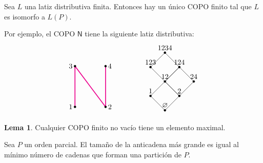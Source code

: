 \documentclass[spanish]{book}
\theoremstyle{definition}
\newtheorem*{lema}{Lema}
\begin{document}
\begin{teo}
	Sea $L$ una latiz distributiva finita. Entonces hay un único COPO finito tal que $L$ es isomorfo a $L(P)$.
\end{teo}
Por ejemplo, el COPO $\mathsf{N}$ tiene la siguiente latiz distributiva:
\[\begin{tikzpicture}
	\draw[magenta,very thick] (0,0) -- (0,2);
	\draw[magenta,very thick] (0,2) -- (1.5,0);
	\draw[magenta,very thick] (1.5,0) -- (1.5,2);
	
	\filldraw (1.5,0) circle (0.05) node[right] {2};
	\filldraw (1.5,2) circle (0.05)node[right] {4};
	\filldraw (0,2) circle (0.05) node[left] {3};
	\filldraw (0,0) circle (0.05) node[left] {1};
\end{tikzpicture}\qquad\qquad
\begin{tikzpicture}
	\draw[rotate=45] (8, 1) rectangle (9, 2);
	\draw[rotate=45] (7, 0) rectangle (8, 1);
	\draw[rotate=45] (8, 0) rectangle (9, 1);
	
	\foreach \x/\y/\label in {8/1/12, 7/0/$\varnothing$, 7/1/1, 8/0/2, 9/0/24, 9/1/124, 8/2/123, 9/2/1234}
	\filldraw[rotate=45] (\x, \y) circle (0.05) node[anchor=south] {\label};
\end{tikzpicture}\]
\begin{lema}
	Cualquier COPO finito no vacío tiene un elemento maximal.
\end{lema}
\begin{teo}[Dilworth, 1950]
	Sea $P$ un orden parcial. El tamaño de la anticadena más grande es igual al mínimo número de cadenas que forman una partición de $P$.
\end{teo}
\end{document}
